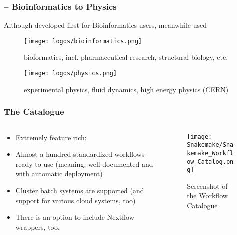 \begin{frame}
	\frametitle{\Snakemake -- Bioinformatics to Physics}
	Although developed first for Bioinformatics users, meanwhile used 
	\begin{figure}[ht]
		\begin{minipage}[b]{0.45\linewidth}
			\centering
			\vspace{-1em}
			\texttt{[image: logos/bioinformatics.png]}
			\vspace{0.5em}
			\caption*{bioformatics, incl. pharmaceutical research, structural biology, etc.}
			\label{fig:a}
		\end{minipage}
		\hspace{0.5cm}
		\begin{minipage}[b]{0.45\linewidth}
			\centering
			\vspace{-0.8em}
			\texttt{[image: logos/physics.png]}
			\vspace{0.5em}
			\caption*{experimental physics, fluid dynamics, high energy physics (CERN)}
			\label{fig:b}
		\end{minipage}
	\end{figure}
\end{frame}


\begin{frame}
	\frametitle{The \Snakemake{} Catalogue}
	\begin{columns}
		\begin{column}{0.5\textwidth}
			\begin{itemize}[<+->]
				\item Extremely feature rich: 
				\item Almost a hundred standardized workflows ready to use (meaning: well documented and with automatic deployment)
				\item Cluster batch systems are supported (and support for various cloud systems, too)
				\item There is an option to include Nextflow wrappers, too.
			\end{itemize}
		\end{column}
		\begin{column}{0.5\textwidth}
			\begin{figure}
				\texttt{[image: Snakemake/Snakemake\_Workflow\_Catalog.png]}
				\caption*{Screenshot of the Workflow Catalogue}
			\end{figure}
		\end{column}
	\end{columns}
\end{frame}

